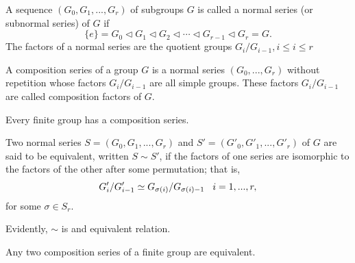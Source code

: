 \begin{defi}
    A sequence $(G_0,G_1,...,G_r)$ of subgroups $G$ is called a normal series (or subnormal series) of $G$ if
    \begin{equation*}
        \{e\}=G_0\vartriangleleft G_1\vartriangleleft G_2\vartriangleleft\cdots \vartriangleleft G_{r-1}\vartriangleleft G_r=G.
    \end{equation*}
    The factors of a normal series are the quotient groups $G_i/G_{i-1}, i\leq i\leq r$
\end{defi}
\begin{defi}
    A composition series of a group $G$ is a normal series $(G_0,...,G_r)$ without repetition whose factors $G_i/G_{i-1}$ are all simple groups. These factors $G_i/G_{i-1}$ are called composition factors of $G$.
\end{defi}
\begin{lema}
    Every finite group has a composition series.
\end{lema}
\begin{defi}
    Two normal series $S=(G_0,G_1,...,G_r)$ and $S'=(G'_0,G'_1,...,G'_r)$ of $G$ are said to be equivalent, written $S\sim S'$, if the factors of one series are isomorphic to the factors of the other after some permutation; that is,
    \begin{equation*}
        G'_i/G'_{i-1}\simeq G_{\sigma(i)}/G_{\sigma(i)-1}\hspace{.3cm}i=1,...,r,
    \end{equation*}
    for some $\sigma\in S_r$.
\end{defi}
Evidently, $\sim$ is and equivalent relation.
\begin{teo}
    Any two composition series of a finite group are equivalent. 
\end{teo}
